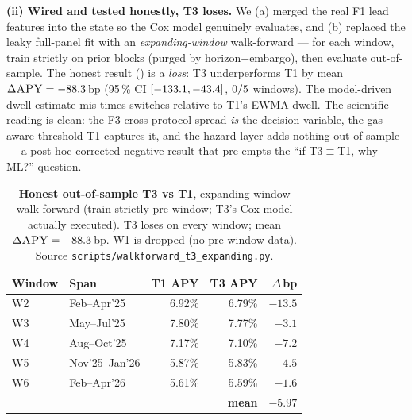 \textbf{(ii) Wired and tested honestly, T3 loses.}  We (a) merged the
real F1 lead features into the state so the Cox model genuinely
evaluates, and (b) replaced the leaky full-panel fit with an
\emph{expanding-window} walk-forward --- for each window, train
strictly on prior blocks (purged by horizon$+$embargo), then
evaluate out-of-sample.  The honest result ()
is a \emph{loss}: T3 underperforms T1 by mean
$\Delta\textsc{APY} = -88.3$\,bp
(95\,\% CI $[-133.1, -43.4]$,
$0/5$ windows).  The model-driven dwell
estimate mis-times switches relative to T1's EWMA dwell.  The
scientific reading is clean: the F3 cross-protocol spread \emph{is}
the decision variable, the gas-aware threshold T1 captures it, and
the hazard layer adds nothing out-of-sample --- a post-hoc corrected
negative result that pre-empts the ``if T3$\equiv$T1, why ML?''
question.

\begin{table}[t]
  \centering
  \caption{\textbf{Honest out-of-sample T3 vs T1}, expanding-window
    walk-forward (train strictly pre-window; T3's Cox model actually
    executed).  T3 loses on every window; mean
    $\Delta\textsc{APY} = -88.3$\,bp.  W1 is dropped
    (no pre-window data). Source
    \texttt{scripts/walkforward\_t3\_expanding.py}.}
  \label{tab:wf-t3-vs-t1}
  \setlength{\tabcolsep}{4pt}
  \begin{tabular}{llrrr}
    \toprule
    Window & Span & T1 APY & T3 APY & $\Delta$\,bp \\
    \midrule
    W2 & Feb--Apr'25    & 6.92\% & 6.79\% & $-13.5$ \\
    W3 & May--Jul'25    & 7.80\% & 7.77\% & $-3.1$ \\
    W4 & Aug--Oct'25    & 7.17\% & 7.10\% & $-7.2$ \\
    W5 & Nov'25--Jan'26 & 5.87\% & 5.83\% & $-4.5$ \\
    W6 & Feb--Apr'26    & 5.61\% & 5.59\% & $-1.6$ \\
    \midrule
    \multicolumn{4}{r}{\textbf{mean}} & $\mathbf{-5.97}$ \\
    \bottomrule
  \end{tabular}
\end{table}

